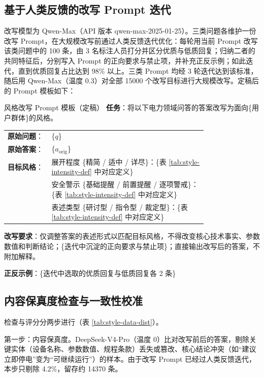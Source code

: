 \documentclass[fontset=fandol,type=master,campus=shenzhen,etitleauto=true]{hithesisbook}
\begin{document}
\subsection{基于人类反馈的改写 Prompt 迭代}\label{ux57faux4e8e-sft-ux6570ux636eux7684ux573aux666fux9002ux914dux6539ux5199}

改写模型为 Qwen-Max（API 版本 qwen-max-2025-01-25）。三类问题各维护一份改写 Prompt，在大规模改写前通过人类反馈迭代优化：每轮用当前 Prompt 改写该类问题中的 100 条，由 3 名标注人员打分并区分优质与低质回复；归纳二者的共同特征后，分别写入 Prompt 的正向要求与禁止项，并补充正反示例；如此迭代，直到优质回复占比达到 98\% 以上。三类 Prompt 均经 3 轮迭代达到该标准，随后用 Qwen-Max（温度 0.3）对全部 15000 个改写目标进行大规模改写。定稿后的 Prompt 模板如下：

\begin{promptbox}{风格改写 Prompt 模板（定稿）}
\textbf{任务}：将以下电力领域问答的答案改写为面向\{用户群体\}的风格。\par\smallskip
\begin{tabular}{@{}l@{\;}p{0.78\linewidth}@{}}
\textbf{原始问题}： & \{$q$\} \\
\textbf{原始答案}： & \{$a_{\text{orig}}$\} \\
\textbf{目标风格}： & 展开程度 \{精简 / 适中 / 详尽\}：\{表 \ref{tab:style-intensity-def} 中对应定义\} \\
 & 安全警示 \{基础提醒 / 前置提醒 / 逐项警戒\}：\{表 \ref{tab:style-intensity-def} 中对应定义\} \\
 & 表述类型 \{研讨型 / 指令型 / 裁定型\}：\{表 \ref{tab:style-intensity-def} 中对应定义\} \\
\end{tabular}\par\smallskip
\textbf{改写要求}：仅调整答案的表述形式以匹配目标风格，不得改变核心技术事实、参数数值和判断结论；\{迭代中沉淀的正向要求与禁止项\}；直接输出改写后的答案，不附加解释。\par\smallskip
\textbf{正反示例}：\{迭代中选取的优质回复与低质回复各 2 条\}
\end{promptbox}

\subsection{内容保真度检查与一致性校准}\label{ux4e09ux8f6eux8d28ux91cfux7b5bux9009}

检查与评分分两步进行（表 \ref{tab:style-data-dist}）。

第一步：内容保真度。DeepSeek-V4-Pro（温度 0）比对改写前后的答案，剔除关键实体（设备名称、参数数值、规程条款）丢失或篡改、核心结论冲突（如“建议立即停电”变为“可继续运行”）的样本。由于改写 Prompt 已经过人类反馈迭代，本步只剔除 4.2\%，留存约 14370 条。
\end{document}
